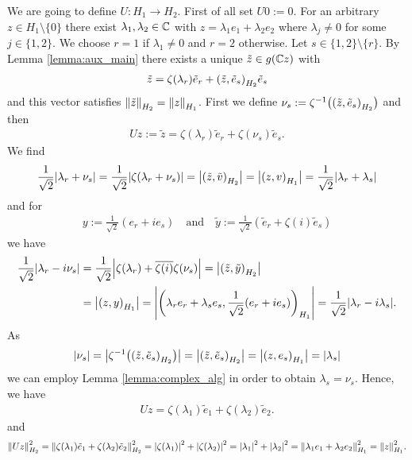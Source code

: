 \begin{example}
	We are going to define $U:H_1 \to H_2$. First of all set $U0 := 0$. For an arbitrary $z \in H_1 \setminus \{0\}$ there exist $\lambda_1, \lambda_2 \in \C$ with $z = \lambda_1 e_1 + \lambda_2 e_2$ where $\lambda_j \neq 0$ for some $j \in \{1,2\}$. We choose $r = 1$ if $\lambda_1 \neq 0$ and $r = 2$ otherwise. Let $s \in \{1, 2\} \setminus \{r\}$. By Lemma \ref{lemma:aux_main} there exists a unique $\tilde{z} \in g(\C z)$ with 
	\begin{align*}
		\tilde{z} = \zeta(\lambda_r) \tilde{e}_r + \pbraces{\tilde{z}, \tilde{e}_s}_{H_2} \tilde{e}_s
	\end{align*}
	and this vector satisfies $\norm[H_2]{\tilde{z}} = \norm[H_1]{z}$. First we define $\nu_s := \zeta^{-1}\pbraces{\pbraces{\tilde{z}, \tilde{e}_s}_{H_2}}$ and then
	\begin{align*}
		Uz := \tilde{z} = \zeta(\lambda_r) \tilde{e}_r + \zeta(\nu_s) \tilde{e}_s.
	\end{align*}
	We find 
	\begin{align*}
		\frac{1}{\sqrt{2}} \vbraces{\lambda_r + \nu_s} = \frac{1}{\sqrt{2}} \vbraces{\zeta(\lambda_r + \nu_s)}= \vbraces{\pbraces{\tilde{z}, \tilde{v}}_{H_2}} = \vbraces{\pbraces{z, v}_{H_1}} = \frac{1}{\sqrt{2}} \vbraces{\lambda_r + \lambda_s}
	\end{align*}
	and for
	\begin{align*}
		y := \frac{1}{\sqrt{2}}(e_r + ie_s) \quad \text{and} \quad \tilde{y} := \frac{1}{\sqrt{2}} (\tilde{e}_r + \zeta(i) \tilde{e}_s)
	\end{align*} 
	we have
	\begin{align*}
		\frac{1}{\sqrt{2}}\vbraces{\lambda_r - i\nu_s} &= \frac{1}{\sqrt{2}} \vbraces{\zeta(\lambda_r) + \overline{\zeta(i)} \zeta(\nu_s)}= \vbraces{\pbraces{\tilde{z}, \tilde{y}}_{H_2}} \\
		&= \vbraces{\pbraces{z, y}_{H_1}} = \vbraces{\pbraces{\lambda_r e_r + \lambda_s e_s, \frac{1}{\sqrt{2}}(e_r + ie_s)}_{H_1}} = \frac{1}{\sqrt{2}} \vbraces{\lambda_r - i\lambda_s}.
	\end{align*}
	As
	\begin{align*}
		\vbraces{\nu_s} = \vbraces{\zeta^{-1}\pbraces{\pbraces{\tilde{z}, \tilde{e}_s}_{H_2}}} = \vbraces{\pbraces{\tilde{z}, \tilde{e}_s}_{H_2}} = \vbraces{\pbraces{z, e_s}_{H_1}} = \vbraces{\lambda_s}
	\end{align*} 
	we can employ Lemma \ref{lemma:complex_alg} in order to obtain $\lambda_s = \nu_s$. Hence, we have
	\begin{align*}
		Uz = \zeta(\lambda_1) \tilde{e}_1 + \zeta(\lambda_2) \tilde{e}_2.
	\end{align*}
	and
	\begin{align*}
		\norm[H_2]{Uz}^2 = \norm[H_2]{\zeta\pbraces{\lambda_1} \tilde{e}_1 + \zeta\pbraces{\lambda_2} \tilde{e}_2}^2 = \vbraces{\zeta\pbraces{\lambda_1}}^2 + \vbraces{\zeta\pbraces{\lambda_2}}^2 = \vbraces{\lambda_1}^2 + \vbraces{\lambda_2}^2 = \norm[H_1]{\lambda_1 e_1 + \lambda_2 e_2}^2 = \norm[H_1]{z}^2.
	\end{align*}
\end{example}


